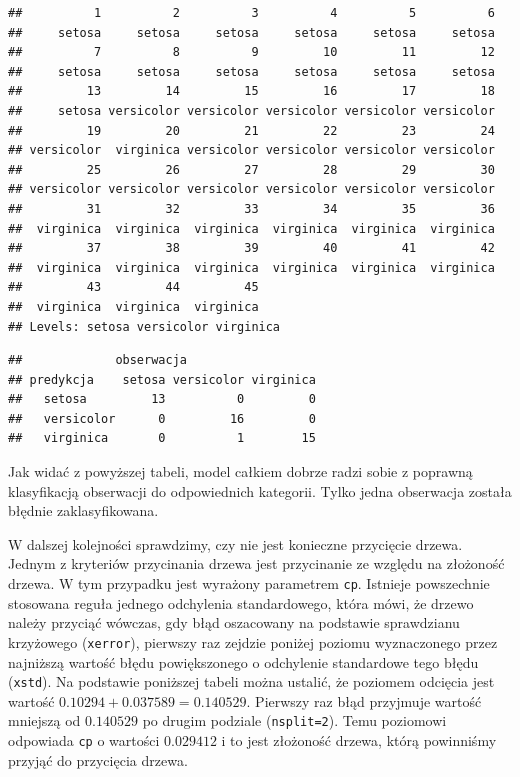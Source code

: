 \documentclass[]{book}
\newenvironment{Shaded}{\begin{snugshade}}{\end{snugshade}}
\newcommand{\DataTypeTok}[1]{\textcolor[rgb]{0.13,0.29,0.53}{#1}}
\newcommand{\KeywordTok}[1]{\textcolor[rgb]{0.13,0.29,0.53}{\textbf{#1}}}
\newcommand{\NormalTok}[1]{#1}
\newcommand{\OperatorTok}[1]{\textcolor[rgb]{0.81,0.36,0.00}{\textbf{#1}}}
\newcommand{\StringTok}[1]{\textcolor[rgb]{0.31,0.60,0.02}{#1}}
\theoremstyle{plain}
\theoremstyle{definition}
\theoremstyle{definition}
\theoremstyle{definition}
\theoremstyle{definition}
\theoremstyle{remark}
\begin{document}
\begin{verbatim}
##          1          2          3          4          5          6 
##     setosa     setosa     setosa     setosa     setosa     setosa 
##          7          8          9         10         11         12 
##     setosa     setosa     setosa     setosa     setosa     setosa 
##         13         14         15         16         17         18 
##     setosa versicolor versicolor versicolor versicolor versicolor 
##         19         20         21         22         23         24 
## versicolor  virginica versicolor versicolor versicolor versicolor 
##         25         26         27         28         29         30 
## versicolor versicolor versicolor versicolor versicolor versicolor 
##         31         32         33         34         35         36 
##  virginica  virginica  virginica  virginica  virginica  virginica 
##         37         38         39         40         41         42 
##  virginica  virginica  virginica  virginica  virginica  virginica 
##         43         44         45 
##  virginica  virginica  virginica 
## Levels: setosa versicolor virginica
\end{verbatim}

\begin{Shaded}
\end{Shaded}

\begin{verbatim}
##             obserwacja
## predykcja    setosa versicolor virginica
##   setosa         13          0         0
##   versicolor      0         16         0
##   virginica       0          1        15
\end{verbatim}

Jak widać z powyższej tabeli, model całkiem dobrze radzi sobie z poprawną klasyfikacją obserwacji do odpowiednich kategorii. Tylko jedna obserwacja została błędnie zaklasyfikowana.

W dalszej kolejności sprawdzimy, czy nie jest konieczne przycięcie drzewa. Jednym z kryteriów przycinania drzewa jest przycinanie ze względu na złożoność drzewa. W tym przypadku jest wyrażony parametrem \texttt{cp}. Istnieje powszechnie stosowana reguła jednego odchylenia standardowego, która mówi, że drzewo należy przyciąć wówczas, gdy błąd oszacowany na podstawie sprawdzianu krzyżowego (\texttt{xerror}), pierwszy raz zejdzie poniżej poziomu wyznaczonego przez najniższą wartość błędu powiększonego o odchylenie standardowe tego błędu (\texttt{xstd}). Na podstawie poniższej tabeli można ustalić, że poziomem odcięcia jest wartość \(0.10294+0.037589=0.140529\). Pierwszy raz błąd przyjmuje wartość mniejszą od \(0.140529\) po drugim podziale (\texttt{nsplit=2}). Temu poziomowi odpowiada \texttt{cp} o wartości \(0.029412\) i to jest złożoność drzewa, którą powinniśmy przyjąć do przycięcia drzewa.
\end{document}
